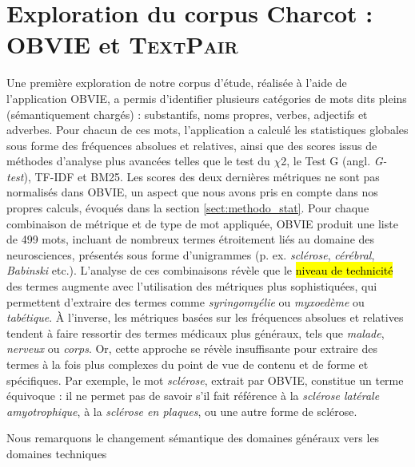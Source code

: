 \section{Exploration du corpus Charcot : \textsc{OBVIE} et \textsc{TextPair}}
\label{sect:obvie_textpair}
Une première exploration de notre corpus d'étude, réalisée à l'aide de l'application \textsc{OBVIE}, a permis d'identifier plusieurs catégories de mots dits \og{}pleins\fg{} (sémantiquement chargés) : substantifs, noms propres, verbes, adjectifs et adverbes. Pour chacun de ces mots, l'application a calculé les statistiques globales sous forme des fréquences absolues et relatives, ainsi que des scores issus de méthodes d'analyse plus avancées telles que le test du \textsc{$\chi$2}, le Test \textsc{G} (angl. \textit{G-test}), \textsc{TF-IDF} et \textsc{BM25}. Les scores des deux dernières métriques ne sont pas normalisés dans \textsc{OBVIE}, un aspect que nous avons pris en compte dans nos propres calculs, évoqués dans la section \ref{sect:methodo_stat}. Pour chaque combinaison de métrique et de type de mot appliquée, \textsc{OBVIE} produit une liste de 499 mots, incluant de nombreux termes étroitement liés au domaine des neurosciences, présentés sous forme d'unigrammes (p. ex. \textit{sclérose}, \textit{cérébral}, \textit{Babinski} etc.). L'analyse de ces combinaisons révèle que le \hl{niveau de technicité} des termes augmente avec l'utilisation des métriques plus sophistiquées, qui permettent d'extraire des termes comme \textit{syringomyélie} ou \textit{myxoedème} ou \textit{tabétique}. À l'inverse, les métriques basées sur les fréquences absolues et relatives tendent à faire ressortir des termes médicaux plus généraux, tels que \textit{malade}, \textit{nerveux} ou \textit{corps}. Or, cette approche se révèle insuffisante pour extraire des termes à la fois plus complexes du point de vue de contenu et de forme et spécifiques. Par exemple, le mot \textit{sclérose}, extrait par \textsc{OBVIE}, constitue un terme équivoque : il ne permet pas de savoir s'il fait référence à la \textit{sclérose latérale amyotrophique}, à la \textit{sclérose en plaques}, ou une autre forme de sclérose. 

Nous remarquons le changement sémantique  des domaines généraux vers les domaines techniques


